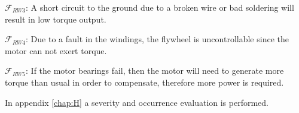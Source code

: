 $\mathcal{F}_{RW3}$:
A short circuit to the ground due to a broken wire or bad soldering will result in low torque output. 

$\mathcal{F}_{RW4}$:  
Due to a fault in the windings, the flywheel is uncontrollable since the motor can not exert torque.

$\mathcal{F}_{RW5}$:  
If the motor bearings fail, then the motor will need to generate more torque than usual in order to compensate, therefore more power is required.

%

In appendix \ref{chap:H} a severity and occurrence evaluation is performed.
